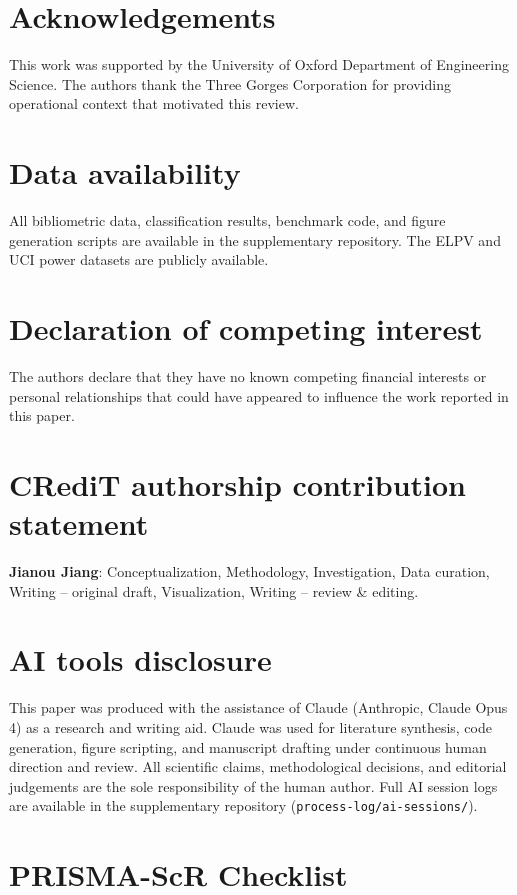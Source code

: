 \documentclass[preprint,12pt]{elsarticle}
\begin{document}
\section*{Acknowledgements}
This work was supported by the University of Oxford Department of Engineering Science. The authors thank the Three Gorges Corporation for providing operational context that motivated this review.

\section*{Data availability}
All bibliometric data, classification results, benchmark code, and figure generation scripts are available in the supplementary repository. The ELPV and UCI power datasets are publicly available.

\section*{Declaration of competing interest}
The authors declare that they have no known competing financial interests or personal relationships that could have appeared to influence the work reported in this paper.

\section*{CRediT authorship contribution statement}
\textbf{Jianou Jiang}: Conceptualization, Methodology, Investigation, Data curation, Writing -- original draft, Visualization, Writing -- review \& editing.

\section*{AI tools disclosure}
This paper was produced with the assistance of Claude (Anthropic, Claude Opus 4) as a research and writing aid. Claude was used for literature synthesis, code generation, figure scripting, and manuscript drafting under continuous human direction and review. All scientific claims, methodological decisions, and editorial judgements are the sole responsibility of the human author. Full AI session logs are available in the supplementary repository (\texttt{process-log/ai-sessions/}).

\appendix
\section{PRISMA-ScR Checklist}
\label{app:prisma_checklist}
\end{document}
